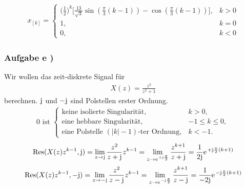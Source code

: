 \begin{align}
	x_[k]=\begin{cases}
		\bigg(\frac{1}{2}\bigg)^{k}\Bigg[\frac{13}{\sqrt{3}}\sin(\frac{\pi}{3}(k-1))-\cos(\frac{\pi}{3}(k-1))\Bigg], &k>0 \\
		1, &k=0 \\
		0, &k<0
	\end{cases}
\end{align}
\subsubsection{Aufgabe e )}
Wir wollen das zeit-diskrete Signal für 
\begin{align}
	X(z)=\frac{z^2}{z^2+1}
\end{align}
berechnen.
$\im$ und $-\im$ sind Polstellen erster Ordnung.
\begin{align}
	0 \text{ ist }\begin{cases}
		\text{keine isolierte Singularität}, &k> 0,\\
		\text{eine hebbare Singularität}, &-1\leq k \leq 0,\\
		\text{eine Polstelle } (|k|-1)\text{-ter Ordnung}, &k<-1.
	\end{cases}
\end{align}
\begin{align}
	\mathrm{Res}(X(z)z^{k-1},\im)=\lim\limits_{z\rightarrow\im}\frac{z^2}{z+\im}z^{k-1}=\lim\limits_{z\rightarrow\e^{+\im\frac{\pi}{2}}}\frac{z^{k+1}}{z+\im}=\frac{1}{2\im}\e^{+\im\frac{\pi}{2}(k+1)}
\end{align}
\begin{align}
	\mathrm{Res}(X(z)z^{k-1},-\im)=\lim\limits_{z\rightarrow-\im}\frac{z^2}{z-\im}z^{k-1}=\lim\limits_{z\rightarrow\e^{-\im\frac{\pi}{2}}}\frac{z^{k+1}}{z-\im}=\frac{1}{-2\im}\e^{-\im\frac{\pi}{2}(k+1)}
\end{align}
